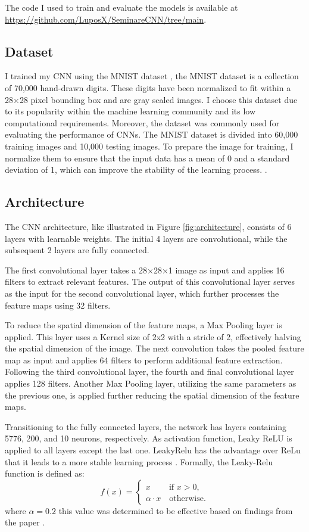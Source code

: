 The code I used to train and evaluate the models is available at \url{https://github.com/LuposX/SeminareCNN/tree/main}.

\subsection{Dataset}

I trained my CNN using the MNIST dataset \citep{CNNLeCunDocumentRecog}, the MNIST dataset is a collection of 70,000 hand-drawn digits. 
These digits have been normalized to fit within a 28×28 pixel bounding box and are gray scaled images.
I choose this dataset due to its popularity within the machine learning community and its low computational requirements.
Moreover, the dataset was commonly used for evaluating the performance of CNNs.
The MNIST  dataset is divided into 60,000 training images and 10,000 testing images.
To prepare the image for training, I normalize them to ensure that the input data has a mean of 0 and a standard deviation of 1, which can improve the stability of the learning process. \citep{589532}.

\subsection{Architecture}

The CNN architecture, like illustrated in Figure \ref{fig:architecture}, consists of 6 layers with learnable weights. The initial 4 layers are convolutional, while the subsequent 2 layers are fully connected.

The first convolutional layer takes a 28×28×1 image as input and applies 16 filters to extract relevant features.
The output of this convolutional layer serves as the input for the second convolutional layer, which further processes the feature maps using 32 filters.

To reduce the spatial dimension of the feature maps, a Max Pooling layer is applied.
This layer uses a Kernel size of 2x2 with a stride of 2, effectively halving the spatial dimension of the image.
The next convolution takes the pooled feature map as input and applies 64 filters to perform additional feature extraction.
Following the third convolutional layer, the fourth and final convolutional layer applies 128 filters.
Another Max Pooling layer, utilizing the same parameters as the previous one, is applied further reducing the spatial dimension of the feature maps.

Transitioning to the fully connected layers, the network has layers containing 5776, 200, and 10 neurons, respectively. As activation function, Leaky ReLU is applied to all layers except the last one. LeakyRelu has the advantage over ReLu that it leads to a more stable learning process \citep{Maas2013RectifierNI}.
Formally, the Leaky-Relu function is defined as: 
$$
f(x) =
\begin{cases}
x \qquad \ \text{if } x >0, \\ 
\alpha \cdot x \quad \text{otherwise.}
\end{cases}
$$
where $\alpha = 0.2$ this value was determined to be effective based on findings from the paper \citep{xu2015Reluempirical}.

